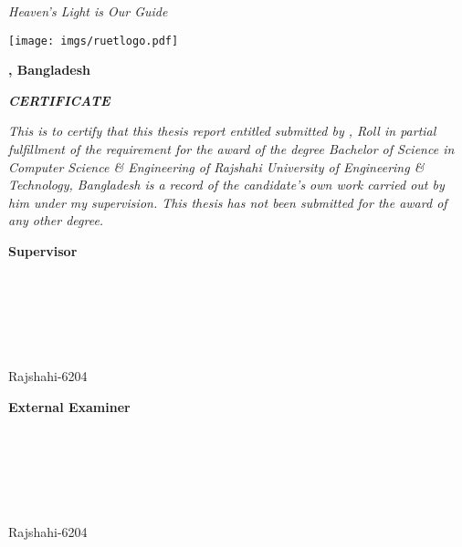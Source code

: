 \documentclass[document.tex]{subfiles}
\begin{document}

\begin{center}
\textit{Heaven's Light is Our Guide}
\vspace{1cm}

\texttt{[image: imgs/ruetlogo.pdf]}

\vspace{1cm}
\textbf{{\fontsize{12pt}{0.5cm} \selectfont \dept}}

\vspace{0.5cm}
\textbf{{\fontsize{14pt}{0.5cm}\selectfont \ruet, Bangladesh}}

\vspace{0.5cm}
\textbf{{\fontsize{16pt}{0.5cm}\selectfont \textit{CERTIFICATE}}}

\vspace{1cm}

\end{center}

\noindent \textit{This is to certify that this thesis report entitled \textbf{\thesistitle} submitted by \textbf{\authorname}, Roll \textbf{\authorroll} \thinspace in partial fulfillment of the requirement for the award of the degree Bachelor of Science in Computer Science \& Engineering of Rajshahi University of Engineering \& Technology, Bangladesh is a record of the candidate's own work carried out by him under my supervision. This thesis has not been submitted for the award of any other degree.}

\vspace{1.5cm}
\noindent
	\begin{minipage}{.4\textwidth}
		\textbf{{\fontsize{12pt}{0.5cm}Supervisor}}\\
		\vline\\
		\text{---------------------------}\\
		\textbf{\fontsize{12pt}{0.5cm}\thesissupervisor}\\
		\text{\fontsize{12pt}{0.5cm}\thesissupervisordesignation}\\
		\deptT\\
		\ruet\\
		Rajshahi-6204
	\end{minipage}%
\hspace{2.1cm}
	\noindent
	\begin{minipage}{.4\textwidth}
		\textbf{{\fontsize{12pt}{0.5cm}External Examiner}}\\
		\vline\\
		\text{---------------------------}\\
		\textbf{\fontsize{12pt}{0.5cm}}\\
		\text{\fontsize{12pt}{0.5cm} }\\
		\deptT\\
		\ruet\\
		Rajshahi-6204
	\end{minipage}%
\vspace{1cm}
\clearpage
\end{document}
